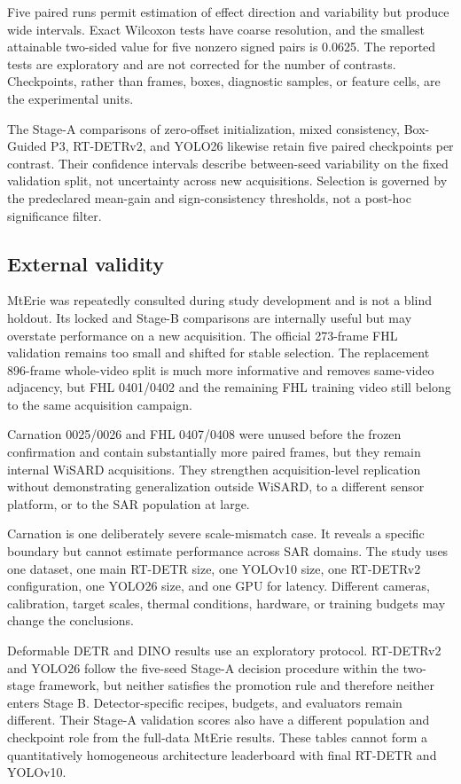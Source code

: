 Five paired runs permit estimation of effect direction and variability but
produce wide intervals. Exact Wilcoxon tests have coarse resolution, and the
smallest attainable two-sided value for five nonzero signed pairs is 0.0625.
The reported tests are exploratory and are not corrected for the number of
contrasts. Checkpoints, rather than frames, boxes, diagnostic samples, or
feature cells, are the experimental units.

The Stage-A comparisons of zero-offset initialization, mixed consistency,
Box-Guided P3, RT-DETRv2, and YOLO26 likewise retain five paired checkpoints
per contrast. Their confidence intervals describe between-seed variability on
the fixed validation split, not
uncertainty across new acquisitions. Selection is governed by the predeclared
mean-gain and sign-consistency thresholds, not a post-hoc significance filter.

\subsection{External validity}

MtErie was repeatedly consulted during study development and is not a blind
holdout. Its locked and Stage-B comparisons are internally useful but may
overstate performance on a new acquisition. The official 273-frame FHL
validation remains too small and shifted for stable selection. The replacement
896-frame whole-video split is much more informative and removes same-video
adjacency, but FHL 0401/0402 and the remaining FHL training video still belong
to the same acquisition campaign.

Carnation 0025/0026 and FHL 0407/0408 were unused before the frozen
confirmation and contain substantially more paired frames, but they remain
internal WiSARD acquisitions. They strengthen acquisition-level replication
without demonstrating generalization outside WiSARD, to a different sensor
platform, or to the SAR population at large.

Carnation is one deliberately severe scale-mismatch case. It reveals a
specific boundary but cannot estimate performance across SAR domains. The
study uses one dataset, one main RT-DETR size, one YOLOv10 size, one
RT-DETRv2 configuration, one YOLO26 size, and one GPU for
latency. Different cameras, calibration, target scales, thermal conditions,
hardware, or training budgets may change the conclusions.

Deformable DETR and DINO results use an exploratory protocol. RT-DETRv2 and
YOLO26 follow the five-seed Stage-A decision procedure within the two-stage
framework, but neither satisfies the promotion rule and therefore neither
enters Stage B. Detector-specific recipes, budgets, and evaluators remain
different. Their Stage-A validation scores also have a different population
and checkpoint role from the full-data MtErie results. These tables cannot form
a quantitatively homogeneous architecture leaderboard with final RT-DETR and
YOLOv10.

